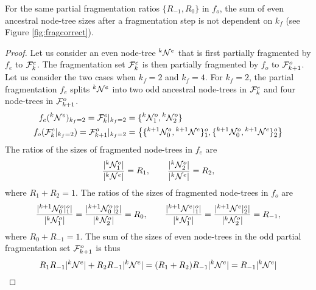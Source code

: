 \begin{lemma}\label{lem:sumevenkf}
  For the same partial fragmentation ratios $\{R_{-1}, R_0\}$ in $f_o$, the sum of even ancestral node-tree sizes after a fragmentation step is not dependent on $k_f$ (see Figure \ref{fig:fragcorrect}).
\end{lemma}
\begin{proof}
  Let us consider an even node-tree ${}^{k}\mathcal{N}^e$ that is first partially fragmented by $f_e$ to $\mathcal{F}^e_k$. The fragmentation set $\mathcal{F}^e_k$ is then partially fragmented by $f_o$ to $\mathcal{F}_{k+1}^o$. Let us consider the two cases when $k_f=2$ and $k_f=4$. For $k_f=2$, the partial fragmentation $f_e$ splits ${}^{k}\mathcal{N}^e$ into two odd ancestral node-trees in $\mathcal{F}^e_k$ and four node-trees in $\mathcal{F}_{k+1}^o$.
  \begin{align*}
    f_e({}^{k}\mathcal{N}^e)_{k_f = 2}
    = \mathcal{F}^e_{k}|_{k_f = 2}
     & = \{ {}^{k} \mathcal{N}^{o}_1, {}^{k} \mathcal{N}^{o}_2\}                                                                             \\
    f_o(\mathcal{F}^e_{k}|_{k_f = 2})
    = \mathcal{F}^o_{k+1}|_{k_f = 2}
     & = \left\{ \{{}^{k+1}\mathcal{N}^{o}_{0}, {}^{k+1}\mathcal{N}^{e}\}^o_1 , \{{}^{k+1}\mathcal{N}^{o}_{0}, {}^{k+1}\mathcal{N}^{e} \}^o_2 \right\}
  \end{align*}
  The ratios of the sizes of fragmented node-trees in $f_e$ are
  \begin{equation*}
    \frac{\lvert{}^{k} \mathcal{N}^{o}_1\rvert}{\lvert{}^{k}\mathcal{N}^e\rvert} = R_1, \hspace{2em}
    \frac{\lvert{}^{k} \mathcal{N}^{o}_2\rvert}{\lvert{}^{k}\mathcal{N}^e\rvert} = R_2,
  \end{equation*}
  where $ R_1 + R_2 = 1$. The ratios of the sizes of fragmented node-trees in $f_o$ are
  \begin{equation*}
    \frac{\lvert{}^{k+1}\mathcal{N}^{o}_0|^o_1\rvert}{\lvert{}^{k} \mathcal{N}^{o}_1\rvert} =
    \frac{\lvert{}^{k+1}\mathcal{N}^{o}_0|^o_2\rvert}{\lvert{}^{k} \mathcal{N}^{o}_2\rvert} = R_0, \hspace{2em}
    \frac{\lvert{}^{k+1}\mathcal{N}^{e}  |^o_1\rvert}{\lvert{}^{k} \mathcal{N}^{o}_1\rvert} =
    \frac{\lvert{}^{k+1}\mathcal{N}^{e}  |^o_2\rvert}{\lvert{}^{k} \mathcal{N}^{o}_2\rvert} = R_{-1},
  \end{equation*}
  where $R_0 + R_{-1} = 1$. The sum of the sizes of even node-trees in the odd partial fragmentation set $\mathcal{F}^o_{k+1}$ is thus
  \begin{equation*}
    R_1 R_{-1} \lvert{}^{k}\mathcal{N}^e\rvert + R_2 R_{-1} \lvert{}^{k}\mathcal{N}^e\rvert = (R_1 + R_2) R_{-1} \lvert{}^{k}\mathcal{N}^e\rvert = R_{-1} \lvert{}^{k}\mathcal{N}^e\rvert
  \end{equation*}


\end{proof}
